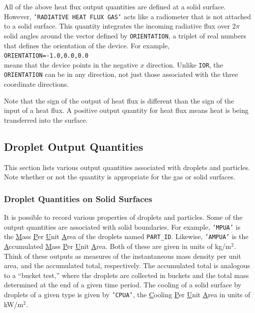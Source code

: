 \documentclass[11pt]{book}
\newcommand{\ct}{\tt\small}
\begin{document}
All of the above heat flux output quantities are defined at a solid surface.
However, {\ct 'RADIATIVE HEAT FLUX GAS'} acts like a radiometer that is not attached to a solid surface.
This quantity integrates the incoming radiative flux over $2\pi$ solid angles around the
vector defined by {\ct ORIENTATION}, a triplet of real numbers that defines the orientation of the device. For example, \\ {\ct ORIENTATION=-1.0,0.0,0.0} \\
means that the device points in the negative $x$ direction. Unlike {\ct IOR}, the {\ct ORIENTATION} can be in any direction, not just those associated with
the three coordinate directions.

Note that the sign of the output of heat flux is different than the sign of the input of a heat flux.  A positive
output quantity for heat flux means heat is being transferred into the surface.

\subsection{Droplet Output Quantities}
\label{info:part_output}

This section lists various output quantities associated with droplets and particles. Note whether or not the quantity is appropriate for the gas or
solid surfaces.

\subsubsection{Droplet Quantities on Solid Surfaces}

It is possible to record various properties of droplets and particles. Some of the output quantities are associated with solid boundaries. For example,
{\ct 'MPUA'} is the \underline{M}ass \underline{P}er \underline{U}nit \underline{A}rea of the droplets named {\ct PART\_ID}.
Likewise, {\ct 'AMPUA'} is the \underline{A}ccumulated \underline{M}ass \underline{P}er \underline{U}nit \underline{A}rea.
Both of these are given in units of kg/m$^2$. Think of these outputs as measures of the instantaneous mass density per unit area,
and the accumulated total, respectively. The accumulated total is analogous to a ``bucket test,'' where the droplets are collected
in buckets and the total mass determined at the end of a given time period. The cooling of a solid surface by droplets of a
given type is given by {\ct 'CPUA'}, the \underline{C}ooling \underline{P}er \underline{U}nit \underline{A}rea in units of kW/m$^2$.
\end{document}
